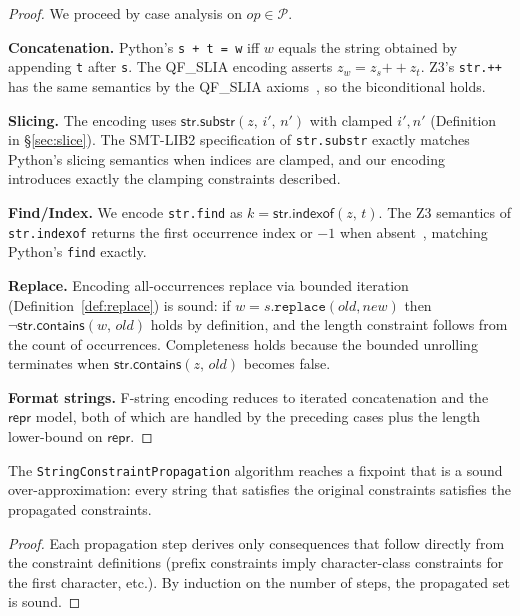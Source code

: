 \documentclass[11pt]{article}
\newcommand{\QFSLIA}{\textsf{QF\_SLIA}}
\newcommand{\strconcat}[2]{\ensuremath{#1 \mathbin{+\!\!+} #2}}
\newcommand{\strcont}[2]{\ensuremath{\mathsf{str.contains}(#1,\,#2)}}
\newcommand{\strindexof}[2]{\ensuremath{\mathsf{str.indexof}(#1,\,#2)}}
\newcommand{\strsubstr}[3]{\ensuremath{\mathsf{str.substr}(#1,\,#2,\,#3)}}
\begin{document}
\begin{proof}
We proceed by case analysis on $\mathit{op} \in \mathcal{P}$.

\medskip\noindent\textbf{Concatenation.}
Python's \texttt{s + t = w} iff $w$ equals the string obtained by
appending \texttt{t} after \texttt{s}.  The \QFSLIA{} encoding asserts
$z_w = \strconcat{z_s}{z_t}$.  Z3's \texttt{str.++} has the same
semantics by the \QFSLIA{} axioms~\cite{smtlib-strings}, so the
biconditional holds.

\medskip\noindent\textbf{Slicing.}
The encoding uses $\strsubstr{z}{i'}{n'}$ with clamped $i', n'$
(Definition in \S\ref{sec:slice}).  The SMT-LIB2 specification of
\texttt{str.substr} exactly matches Python's slicing semantics when
indices are clamped, and our encoding introduces exactly the clamping
constraints described.

\medskip\noindent\textbf{Find/Index.}
We encode \texttt{str.find} as $k = \strindexof{z}{t}$.  The Z3
semantics of \texttt{str.indexof} returns the first occurrence index or
$-1$ when absent~\cite{z3-strings}, matching Python's \texttt{find}
exactly.

\medskip\noindent\textbf{Replace.}
Encoding all-occurrences replace via bounded iteration
(Definition~\ref{def:replace}) is sound: if $w = s\texttt{.replace}(\mathit{old},
\mathit{new})$ then $\neg\strcont{w}{\mathit{old}}$ holds by definition, and
the length constraint follows from the count of occurrences.  Completeness
holds because the bounded unrolling terminates when $\strcont{z}{\mathit{old}}$
becomes false.

\medskip\noindent\textbf{Format strings.}
F-string encoding reduces to iterated concatenation and the
$\mathsf{repr}$ model, both of which are handled by the preceding cases
plus the length lower-bound on $\mathsf{repr}$.
\end{proof}

\begin{corollary}
\label{cor:propagation}
The \texttt{StringConstraintPropagation} algorithm reaches a fixpoint that is
a sound over-approximation: every string that satisfies the original
constraints satisfies the propagated constraints.
\end{corollary}

\begin{proof}
Each propagation step derives only consequences that follow directly from
the constraint definitions (prefix constraints imply character-class
constraints for the first character, etc.).  By induction on the number of
steps, the propagated set is sound.
\end{proof}
\end{document}
